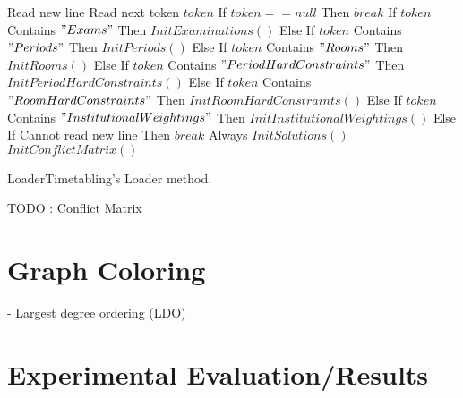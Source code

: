 \begin{algorithm}
\begin{algorithmic}[1]
\State Read new line
\Repeat
	\State Read next token $token$
	\State If $token == null$ Then $break$ 
	\State If $token$ Contains $"Exams"$ Then $InitExaminations()$
	\State Else If $token$ Contains $"Periods"$ Then $InitPeriods()$
	\State Else If $token$ Contains $"Rooms"$ Then $InitRooms()$
	\State Else If $token$ Contains $"PeriodHardConstraints"$ Then $InitPeriodHardConstraints()$
	\State Else If $token$ Contains $"RoomHardConstraints"$ Then $InitRoomHardConstraints()$
	\State Else If $token$ Contains $"InstitutionalWeightings"$ Then $InitInstitutionalWeightings()$
	\State Else If Cannot read new line Then $break$ 
\Until Always
\State $InitSolutions()$
\State $InitConflictMatrix()$
\end{algorithmic}
\caption{LoaderTimetabling's Loader method.}
\label{alg:Load}
\end{algorithm}

TODO : Conflict Matrix

\section{Graph Coloring}

- Largest degree ordering (LDO)

\section{Experimental Evaluation/Results}